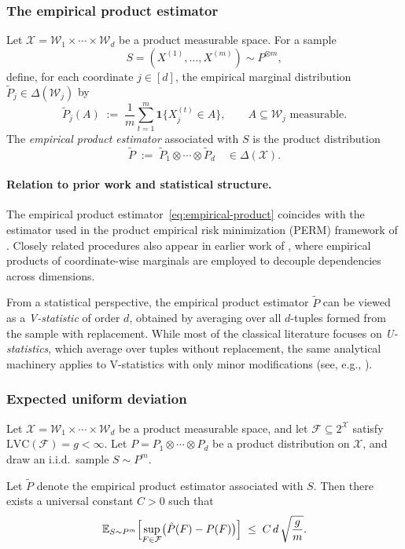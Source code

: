 \documentclass[arxiv]{colt2026}
\newcommand{\X}{\mathcal{X}}
\newcommand{\F}{\mathcal{F}}
\newcommand{\W}{\mathcal{W}}
\newcommand{\E}{\mathbb{E}}
\newcommand{\LVC}{\mathrm{LVC}}
\begin{document}
\subsubsection{The empirical product estimator}
\label{subsec:emp-prod}

Let $\X=\W_1\times\cdots\times\W_d$ be a product measurable space.
For a sample
\[
S=(X^{(1)},\ldots,X^{(m)})\sim P^{\otimes m},
\]
define, for each coordinate $j\in[d]$, the empirical marginal distribution
$\tilde P_j\in\Delta(\W_j)$ by
\[
\tilde P_j(A)
\;:=\;
\frac{1}{m}\sum_{t=1}^m \mathbf 1\{X^{(t)}_j\in A\},
\qquad
A\subseteq \W_j \text{ measurable}.
\]
The \emph{empirical product estimator} associated with $S$ is the product
distribution
\begin{equation}
\label{eq:empirical-product}
\tilde P
\;:=\;
\tilde P_1\otimes\cdots\otimes\tilde P_d
\quad\in\Delta(\X).
\end{equation}

\paragraph{Relation to prior work and statistical structure.}
The empirical product estimator~\eqref{eq:empirical-product} coincides with the
estimator used in the product empirical risk minimization (PERM) framework of
\cite{guo2020}.
Closely related procedures also appear in earlier work of \cite{livni2019},
where empirical products of coordinate-wise marginals are employed to decouple
dependencies across dimensions.

From a statistical perspective, the empirical product estimator $\tilde P$
can be viewed as a \emph{V-statistic} of order $d$, obtained by averaging over
all $d$-tuples formed from the sample with replacement.
While most of the classical literature focuses on \emph{U-statistics}, which
average over tuples without replacement, the same analytical machinery applies
to V-statistics with only minor modifications
(see, e.g., \cite{serfling2009, vaart1998}).


\subsubsection{Expected uniform deviation}

\begin{lemma}
\label{lem:prod-vc-d}
Let $\X=\W_1\times\cdots\times\W_d$ be a product measurable space, and let
$\F\subseteq 2^\X$ satisfy $\LVC(\F)=g<\infty$.
Let $P=P_1\otimes\cdots\otimes P_d$ be a product distribution on $\X$, and draw
an i.i.d.\ sample $S\sim P^{m}$.

Let $\tilde P$ denote the empirical product estimator associated with $S$.
Then there exists a universal constant $C>0$ such that
\[
\E_{S\sim P^{m}}
\Bigl[
\sup_{F\in\F}\bigl(\tilde P(F)-P(F)\bigr)
\Bigr]
\;\le\;
C\,d\,\sqrt{\frac{g}{m}}.
\]
\end{lemma}
\end{document}

